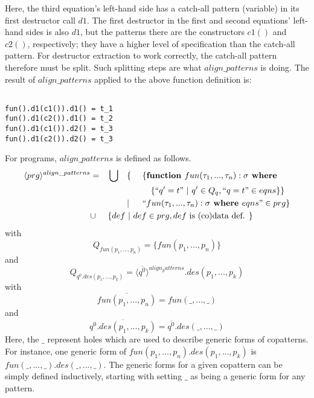 \documentclass[11pt]{article} %
\begin{document}
Here, the third equation's left-hand side has a catch-all pattern (variable) in its first destructor call $d1$. The first destructor in the first and second equations' left-hand sides is also $d1$, but the patterns there are the constructors $c1()$ and $c2()$, respectively; they have a higher level of specification than the catch-all pattern. For destructor extraction to work correctly, the catch-all pattern therefore must be split. Such splitting steps are what $align\_patterns$ is doing. The result of $align\_patterns$ applied to the above function definition is:

\begin{lstlisting}

fun().d1(c1()).d1() = t_1
fun().d1(c2()).d1() = t_2
fun().d1(c1()).d2() = t_3
fun().d1(c2()).d2() = t_3

\end{lstlisting}

For programs, $align\_patterns$ is defined as follows.
\begin{alignat*}{4}
\langle prg \rangle^{align\_patterns} & = &&\bigcup &&\{ ~&&\{ \textrm{\textbf{function }} fun(\tau_1, ..., \tau_n): \sigma \textrm{\textbf{ where }} \\
& && && &&\quad \{ `` q' = t " ~ | ~ q' \in Q_q, `` q = t " \in eqns \} \} \\
& && && | && `` fun (\tau_1, ..., \tau_n): \sigma \textrm{\textbf{ where }} eqns " \in prg \} \\
& \cup && \{ def ~ | ~ def \in prg, def \textrm{ is (co)data def. } \} \span\span\span\span
\end{alignat*}
with
\begin{equation*}
Q_{fun(p_1, ..., p_n)} = \{fun(p_1, ..., p_n)\}
\end{equation*}
and
\begin{equation*}
Q_{q^0.des(p_1, ..., p_k)} = \langle \overline{q^0} \rangle^{align_patterns}.des(p_1, ..., p_k)
\end{equation*}
with
\begin{equation*}
\overline{fun(p_1, ..., p_n)} = fun(\_, ..., \_)
\end{equation*}
and
\begin{equation*}
\overline{q^0.des(p_1, ..., p_k)} = \overline{q^0}.des(\_, ..., \_)
\end{equation*}
Here, the $\_$ represent holes which are used to describe generic forms of copatterns. For instance, one generic form of $fun(p_1, ..., p_n).des(p_1, ..., p_k)$ is $fun(\_, ..., \_).des(\_, ..., \_)$. The generic forms for a given copattern can be simply defined inductively, starting with setting $\_$ as being a generic form for any pattern.
\end{document}
